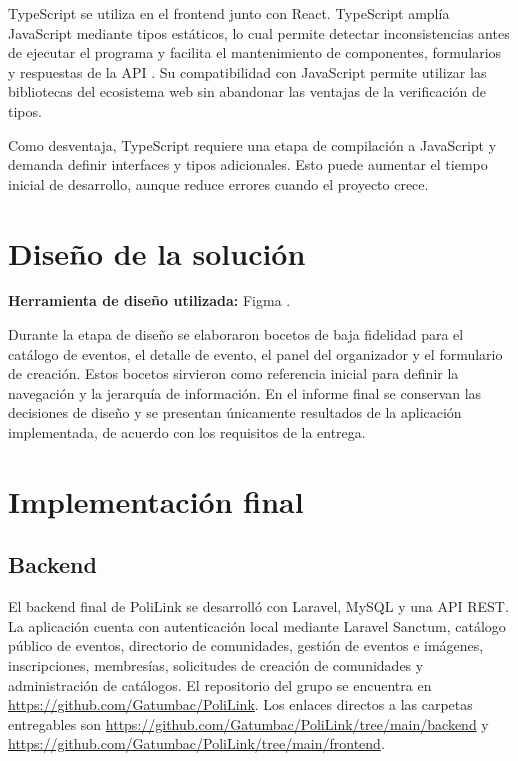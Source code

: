 \documentclass[12pt]{article}
\begin{document}
TypeScript se utiliza en el frontend junto con React. TypeScript amplía JavaScript mediante tipos estáticos, lo cual permite detectar inconsistencias antes de ejecutar el programa y facilita el mantenimiento de componentes, formularios y respuestas de la API \cite{typescript}. Su compatibilidad con JavaScript permite utilizar las bibliotecas del ecosistema web sin abandonar las ventajas de la verificación de tipos.

Como desventaja, TypeScript requiere una etapa de compilación a JavaScript y demanda definir interfaces y tipos adicionales. Esto puede aumentar el tiempo inicial de desarrollo, aunque reduce errores cuando el proyecto crece.

\section{Diseño de la solución}

\textbf{Herramienta de diseño utilizada:} Figma \cite{figma}.

Durante la etapa de diseño se elaboraron bocetos de baja fidelidad para el catálogo de eventos, el detalle de evento, el panel del organizador y el formulario de creación. Estos bocetos sirvieron como referencia inicial para definir la navegación y la jerarquía de información. En el informe final se conservan las decisiones de diseño y se presentan únicamente resultados de la aplicación implementada, de acuerdo con los requisitos de la entrega.

\section{Implementación final}

\subsection{Backend}

El backend final de PoliLink se desarrolló con Laravel, MySQL y una API REST. La
aplicación cuenta con autenticación local mediante Laravel Sanctum, catálogo
público de eventos, directorio de comunidades, gestión de eventos e imágenes,
inscripciones, membresías, solicitudes de creación de comunidades y
administración de catálogos. El repositorio del grupo se encuentra en
\url{https://github.com/Gatumbac/PoliLink}. Los enlaces directos a las carpetas
entregables son \url{https://github.com/Gatumbac/PoliLink/tree/main/backend} y
\url{https://github.com/Gatumbac/PoliLink/tree/main/frontend}.
\end{document}
